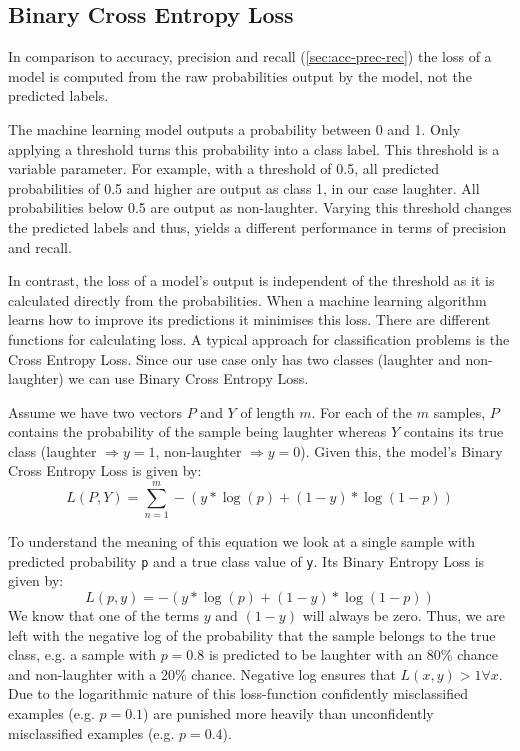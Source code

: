 \documentclass[bsc,frontabs,parskip,deptreport]{infthesis}
\begin{document}
\subsection{Binary Cross Entropy Loss}
In comparison to accuracy, precision and recall (\autoref{sec:acc-prec-rec}) the loss of a model is computed from the raw probabilities output by the model, not the predicted labels.

The machine learning model outputs a probability between 0 and 1. Only applying a threshold turns this probability into a class label. This threshold is a variable parameter.
For example, with a threshold of 0.5, all predicted probabilities of 0.5 and higher are output as class 1, in our case laughter. All probabilities below 0.5 are output as non-laughter. 
Varying this threshold changes the predicted labels and thus, yields a different performance in terms of precision and recall. 

In contrast, the loss of a model's output is independent of the threshold as it is calculated directly from the probabilities.
When a machine learning algorithm learns how to improve its predictions it minimises this loss. There are different functions for calculating loss.
A typical approach for classification problems is the Cross Entropy Loss. Since our use case only has two classes (laughter and non-laughter) we can use Binary Cross Entropy Loss. 

Assume we have two vectors $P$ and $Y$ of length $m$. For each of the $m$ samples, $P$ contains the probability of the sample being laughter whereas $Y$ contains its true class (laughter $\Rightarrow y=1$, non-laughter $ \Rightarrow y=0$).
Given this, the model's Binary Cross Entropy Loss is given by:
$$ L(P,Y) = \sum_{n=1}^{m}  -{(y*\log(p) + (1 - y)*\log(1 - p))}$$

To understand the meaning of this equation we look at a single sample with predicted probability \texttt{p} and a true class value of \texttt{y}. Its Binary Entropy Loss is given by: 
$$ L(p,y) = -{(y*\log(p) + (1 - y)*\log(1 - p))} $$
We know that one of the terms $y$ and $(1-y)$ will always be zero.
Thus, we are left with the negative log of the probability that the sample belongs to the true class, e.g. a sample with $p=0.8$ is predicted to be laughter with an 80\% chance and non-laughter with a 20\% chance. Negative log ensures that $L(x,y) > 1  \forall x $. 
Due to the logarithmic nature of this loss-function confidently misclassified examples (e.g. $p=0.1$) are punished more heavily than unconfidently misclassified examples (e.g. $p=0.4$).
\end{document}
